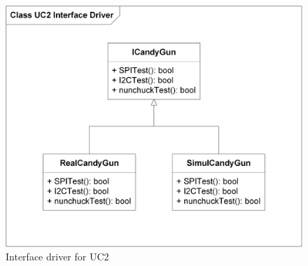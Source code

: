 \begin{figure}[H]
	\centering
	\includegraphics[width=\textwidth]{Afsnit/DesignOgImplementering/images/IdriverKlasseDiagram}
	\caption{Interface driver for UC2}
	\label{fig:idriveruc2}
\end{figure}

